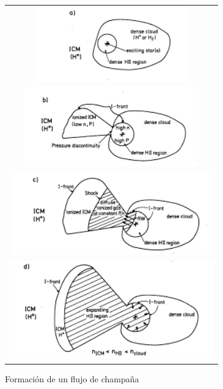 \begin{figure}
  \centering
  \begin{tabular}{c}
  \includegraphics[width=0.71\linewidth]{./Figures/Tenorio-Tagle-champagne-1} \\ \includegraphics[width=0.71\linewidth]{./Figures/Tenorio-Tagle-champagne-2} \\
    \includegraphics[width=0.71\linewidth]{./Figures/Tenorio-Tagle-champagne-3} \\ \includegraphics[width=0.71\linewidth]{./Figures/Tenorio-Tagle-champagne-4}
  \end{tabular}
  \caption{Formación de un flujo de champaña \citep{Tenorio:1979}}
  \label{fig:champagne-Tenorio}
\end{figure}

